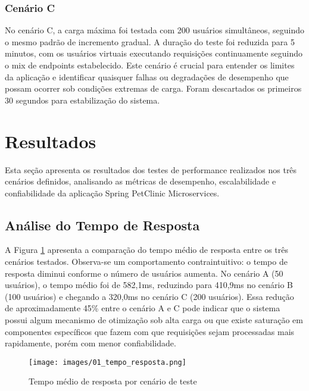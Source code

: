 \documentclass[conference]{IEEEtran}
\begin{document}
    \subsubsection{Cenário C}

    No cenário C, a carga máxima foi testada com 200 usuários simultâneos, seguindo
    o mesmo padrão de incremento gradual. A duração do teste foi reduzida para 5
    minutos, com os usuários virtuais executando requisições continuamente seguindo
    o mix de endpoints estabelecido. Este cenário é crucial para entender os
    limites da aplicação e identificar quaisquer falhas ou degradações de
    desempenho que possam ocorrer sob condições extremas de carga. Foram descartados
    os primeiros 30 segundos para estabilização do sistema.

    \section{Resultados}

    Esta seção apresenta os resultados dos testes de performance realizados nos três
    cenários definidos, analisando as métricas de desempenho, escalabilidade e confiabilidade
    da aplicação Spring PetClinic Microservices.
    
    \subsection{Análise do Tempo de Resposta}

    A Figura \ref{fig:tempo_resposta} apresenta a comparação do tempo médio de
    resposta entre os três cenários testados. Observa-se um comportamento contraintuitivo:
    o tempo de resposta diminui conforme o número de usuários aumenta. No cenário
    A (50 usuários), o tempo médio foi de 582,1ms, reduzindo para 410,9ms no cenário
    B (100 usuários) e chegando a 320,0ms no cenário C (200 usuários). Essa
    redução de aproximadamente 45\% entre o cenário A e C pode indicar que o sistema
    possui algum mecanismo de otimização sob alta carga ou que existe saturação em
    componentes específicos que fazem com que requisições sejam processadas mais
    rapidamente, porém com menor confiabilidade.

    \begin{figure}[htbp]
        \centerline{\texttt{[image: images/01\_tempo\_resposta.png]}}
        \caption{Tempo médio de resposta por cenário de teste}
        \label{fig:tempo_resposta}
    \end{figure}
\end{document}
